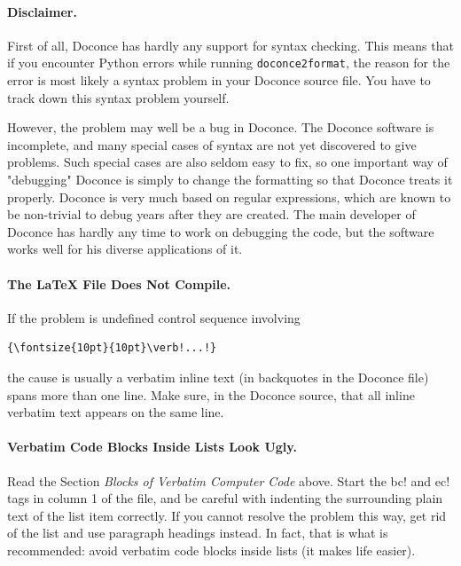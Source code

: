 \documentclass{article}
\begin{document}
\paragraph{Disclaimer.}
First of all, Doconce has hardly any support for
syntax checking. This means that if you encounter Python errors while
running {\fontsize{10pt}{10pt}\verb!doconce2format!}, the reason for the error is most likely a
syntax problem in your Doconce source file. You have to track down
this syntax problem yourself.

However, the problem may well be a bug in Doconce. The Doconce
software is incomplete, and many special cases of syntax are not yet
discovered to give problems. Such special cases are also seldom easy to
fix, so one important way of "debugging" Doconce is simply to change
the formatting so that Doconce treats it properly. Doconce is very much
based on regular expressions, which are known to be non-trivial to
debug years after they are created. The main developer of Doconce has
hardly any time to work on debugging the code, but the software works
well for his diverse applications of it.

\paragraph{The {\LaTeX} File Does Not Compile.}
If the problem is undefined control sequence involving
\begin{Verbatim}[fontsize=\fontsize{9pt}{9pt},tabsize=8,baselinestretch=0.85,
fontfamily=tt,xleftmargin=7mm]
{\fontsize{10pt}{10pt}\verb!...!}
\end{Verbatim}
\noindent
the cause is usually a verbatim inline text (in backquotes in the
Doconce file) spans more than one line. Make sure, in the Doconce source,
that all inline verbatim text appears on the same line.

\paragraph{Verbatim Code Blocks Inside Lists Look Ugly.}
Read the Section \emph{Blocks of Verbatim Computer Code} above.  Start the
{\fontsize{10pt}{10pt}\verb!!bc!} and {\fontsize{10pt}{10pt}\verb!!ec!} tags in column 1 of the file, and be careful with
indenting the surrounding plain text of the list item correctly. If
you cannot resolve the problem this way, get rid of the list and use
paragraph headings instead. In fact, that is what is recommended:
avoid verbatim code blocks inside lists (it makes life easier).
\end{document}
